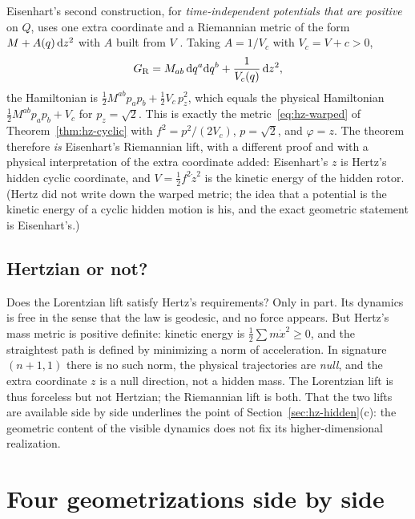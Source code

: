 Eisenhart's second construction, for \emph{time-independent potentials that are positive} on $Q$,
uses one extra coordinate and a Riemannian metric of the form
$M+A(q)\,\mathrm{d} z^2$ with $A$ built from $V$
\cite{hdp:eisenhart1929,hdp:casetti2000}. Taking $A=1/V_c$ with $V_c=V+c>0$,
\begin{equation}\label{eq:hz-eis-riem}
  G_{\rm R}=M_{ab}\,\mathrm{d} q^a\mathrm{d} q^b+\frac{1}{V_c(q)}\,\mathrm{d} z^2 ,
\end{equation}
the Hamiltonian is $\tfrac12M^{ab}p_ap_b+\tfrac12V_c\,p_z^2$, which equals
the physical Hamiltonian $\tfrac12M^{ab}p_ap_b+V_c$ for $p_z=\sqrt2$. This is exactly
the metric~\eqref{eq:hz-warped} of Theorem~\ref{thm:hz-cyclic} with $f^2=p^2/(2V_c)$, $p=\sqrt2$,
and $\varphi=z$. The theorem therefore \emph{is} Eisenhart's Riemannian lift, with a different proof and with
a physical interpretation of the extra coordinate added: Eisenhart's $z$ is Hertz's hidden
cyclic coordinate, and $V=\tfrac12f^2\dot z^2$ is the kinetic energy of the hidden rotor.
(Hertz did not write down the warped metric; the idea that a potential is the kinetic energy of
a cyclic hidden motion is his, and the exact geometric statement is Eisenhart's.)

\subsection{Hertzian or not?}

Does the Lorentzian lift satisfy Hertz's requirements? Only in part. Its dynamics is
free in the sense that the law is geodesic, and no force appears. But Hertz's mass metric is positive
definite: kinetic energy is $\tfrac12\sum m\dot x^2\ge0$, and the straightest path is defined by minimizing
a norm of acceleration. In signature $(n{+}1,1)$ there is no such norm, the physical
trajectories are \emph{null}, and the extra coordinate $z$ is a null direction, not a hidden mass.
The Lorentzian lift is thus forceless but not Hertzian; the Riemannian lift is both.
That the two lifts are available side by side underlines the point of
Section~\ref{sec:hz-hidden}(c): the geometric content of the visible dynamics does not fix its higher-dimensional
realization.

\section{Four geometrizations side by side}
\label{sec:hz-compare}

